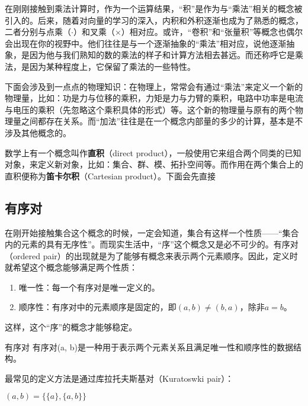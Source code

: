 
在刚刚接触到乘法计算时，作为一个运算结果，“积”是作为与“乘法”相关的概念被引入的。后来，随着对向量的学习的深入，内积和外积逐渐也成为了熟悉的概念，二者分别与点乘（$\cdot$）和叉乘（$\times$）相对应。或许，“卷积”和“张量积”等概念也偶尔会出现在你的视野中。他们往往是与一个逐渐抽象的“乘法”相对应，说他逐渐抽象，是因为他与我们熟知的数的乘法的样子和计算方法相去甚远。而还称呼它是乘法，是因为某种程度上，它保留了乘法的一些特性。

下面会涉及到一点点的物理知识：在物理上，常常会有通过“乘法”来定义一个新的物理量，比如：功是力与位移的乘积，力矩是力与力臂的乘积，电路中功率是电流与电压的乘积（先忽略这个乘积具体的形式）等。这个新的物理量与原有的两个物理量之间都存在关系。而“加法”往往是在一个概念内部量的多少的计算，基本是不涉及其他概念的。

数学上有一个概念叫作\textbf{直积}（direct product），一般使用它来组合两个同类的已知对象，来定义新对象，比如：集合、群、模、拓扑空间等。而作用在两个集合上的直积便称为\textbf{笛卡尔积}（Cartesian product）。下面会先直接

\subsection{有序对}

在刚开始接触集合这个概念的时候，一定会知道，集合有这样一个性质——“集合内的元素的具有无序性”。而现实生活中，“序”这个概念又是必不可少的。有序对（ordered pair）的出现就是为了能够有概念来表示两个元素顺序。因此，定义时就希望这个概念能够满足两个性质：

\begin{enumerate}
\item 唯一性：每一个有序对是唯一定义的。
\item 顺序性：有序对中的元素顺序是固定的，即$(a, b) \neq (b, a)$，除非$a = b$。
\end{enumerate}

这样，这个“序”的概念才能够稳定。

\begin{definition}{有序对}
有序对(a, b)是一种用于表示两个元素关系且满足唯一性和顺序性的数据结构。
\end{definition}



最常见的定义方法是通过库拉托夫斯基对（Kuratoswki pair）：

$(a, b) = \{\{a\}, \{a, b\}\}$





